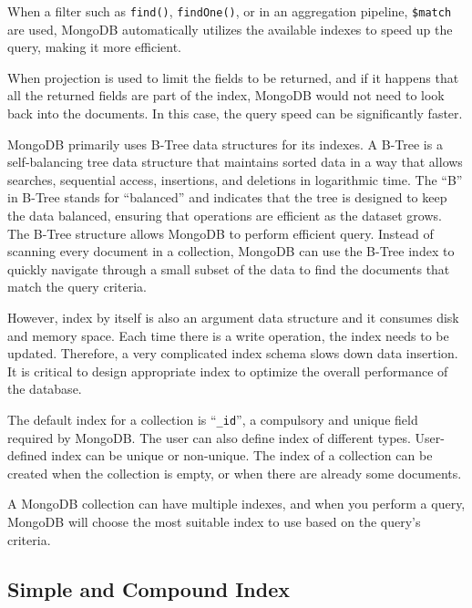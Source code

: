 When a filter such as \verb|find()|, \verb|findOne()|, or in an aggregation pipeline, \verb|$match| are used, MongoDB automatically utilizes the available indexes to speed up the query, making it more efficient.

When projection is used to limit the fields to be returned, and if it happens that all the returned fields are part of the index, MongoDB would not need to look back into the documents. In this case, the query speed can be significantly faster.

\begin{shortbox}

MongoDB primarily uses B-Tree data structures for its indexes. A B-Tree is a self-balancing tree data structure that maintains sorted data in a way that allows searches, sequential access, insertions, and deletions in logarithmic time. The ``B'' in B-Tree stands for ``balanced'' and indicates that the tree is designed to keep the data balanced, ensuring that operations are efficient as the dataset grows. The B-Tree structure allows MongoDB to perform efficient query. Instead of scanning every document in a collection, MongoDB can use the B-Tree index to quickly navigate through a small subset of the data to find the documents that match the query criteria.
\end{shortbox}

However, index by itself is also an argument data structure and it consumes disk and memory space. Each time there is a write operation, the index needs to be updated. Therefore, a very complicated index schema slows down data insertion. It is critical to design appropriate index to optimize the overall performance of the database.

The default index for a collection is ``\verb|_id|'', a compulsory and unique field required by MongoDB. The user can also define index of different types. User-defined index can be unique or non-unique. The index of a collection can be created when the collection is empty, or when there are already some documents.

A MongoDB collection can have multiple indexes, and when you perform a query, MongoDB will choose the most suitable index to use based on the query's criteria.

\subsection{Simple and Compound Index}

